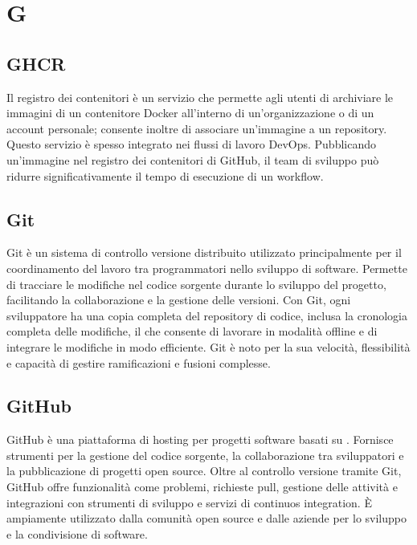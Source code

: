 \section{G}

\vspace{2em}
\subsection*{GHCR}
Il registro dei contenitori è un servizio che permette agli utenti di archiviare le immagini di un contenitore Docker all'interno di un'organizzazione o di un account personale; consente inoltre di associare un'immagine a un repository. Questo servizio è spesso integrato nei flussi di lavoro DevOps. Pubblicando un'immagine nel registro dei contenitori di GitHub, il team di sviluppo può ridurre significativamente il tempo di esecuzione di un workflow.

\vspace{2em}
\subsection*{Git}
Git è un sistema di controllo versione distribuito utilizzato principalmente per il coordinamento del lavoro tra programmatori nello sviluppo di software. Permette di tracciare le modifiche nel codice sorgente durante lo sviluppo del progetto, facilitando la collaborazione e la gestione delle versioni. Con Git, ogni sviluppatore ha una copia completa del repository di codice, inclusa la cronologia completa delle modifiche, il che consente di lavorare in modalità offline e di integrare le modifiche in modo efficiente. Git è noto per la sua velocità, flessibilità e capacità di gestire ramificazioni e fusioni complesse.


\vspace{2em}
\subsection*{GitHub}
GitHub è una piattaforma di hosting per progetti software basati su . Fornisce strumenti per la gestione del codice sorgente, la collaborazione tra sviluppatori e la pubblicazione di progetti open source. Oltre al controllo versione tramite Git, GitHub offre funzionalità come problemi, richieste pull, gestione delle attività e integrazioni con strumenti di sviluppo e servizi di continuos integration. È ampiamente utilizzato dalla comunità open source e dalle aziende per lo sviluppo e la condivisione di software.

